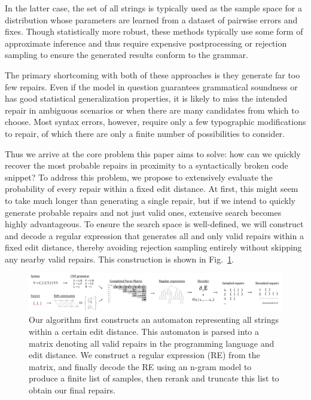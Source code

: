 \documentclass[sigplan,review,acmsmall,nonacm,screen,anonymous]{acmart}\settopmatter{printfolios=false,printccs=false,printacmref=false}
\begin{document}
In the latter case, the set of all strings is typically used as the sample space for a distribution whose parameters are learned from a dataset of pairwise errors and fixes. Though statistically more robust, these methods typically use some form of approximate inference and thus require expensive postprocessing or rejection sampling to ensure the generated results conform to the grammar.

The primary shortcoming with both of these approaches is they generate far too few repairs. Even if the model in question guarantees grammatical soundness or has good statistical generalization properties, it is likely to miss the intended repair in ambiguous scenarios or when there are many candidates from which to choose. Most syntax errors, however, require only a few typographic modifications to repair, of which there are only a finite number of possibilities to consider.

Thus we arrive at the core problem this paper aims to solve: how can we quickly recover the most probable repairs in proximity to a syntactically broken code snippet? To address this problem, we propose to extensively evaluate the probability of every repair within a fixed edit distance. At first, this might seem to take much longer than generating a single repair, but if we intend to quickly generate probable repairs and not just valid ones, extensive search becomes highly advantageous. To ensure the search space is well-defined, we will construct and decode a regular expression that generates all and only valid repairs within a fixed edit distance, thereby avoiding rejection sampling entirely without skipping any nearby valid repairs. This construction is shown in Fig.~\ref{fig:arch_simp}.

\begin{figure}[H]
  \includegraphics[width=\textwidth]{flow}\vspace{-0.1cm}
  \caption{
    Our algorithm first constructs an automaton representing all strings within a certain edit distance. This automaton is parsed into a matrix denoting all valid repairs in the programming language and edit distance. We construct a regular expression (RE) from the matrix, and finally decode the RE using an n-gram model to produce a finite list of samples, then rerank and truncate this list to obtain our final repairs.
  }\label{fig:arch_simp}\vspace{-0.2cm}
\end{figure}
\end{document}
